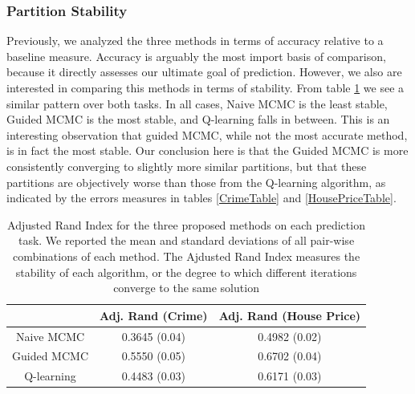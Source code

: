 \subsubsection{Partition Stability}
Previously, we analyzed the three methods in terms of accuracy relative to a baseline measure. Accuracy is arguably the most import basis of comparison, because it directly assesses our ultimate goal of prediction. However, we also are interested in comparing this methods in terms of stability. From table \ref{rand:table} we see a similar pattern over both tasks. In all cases, Naive MCMC is the least stable, Guided MCMC is the most stable, and Q-learning falls in between.  This is an interesting observation that guided MCMC, while not the most accurate method, is in fact the most stable. Our conclusion here is that the Guided MCMC is more consistently converging to slightly more similar partitions, but that these partitions are objectively worse than those from the Q-learning algorithm, as indicated by the errors measures in tables \ref{CrimeTable} and \ref{HousePriceTable}.
\begin{center}
\begin{table}[h!]
\begin{tabular}{ |c|c|c| } 
 \hline
    & Adj. Rand (Crime) & Adj. Rand (House Price) \\
 \hline

 Naive MCMC &  0.3645 (0.04) & 0.4982 (0.02) \\
 \hline
 Guided MCMC &  0.5550 (0.05) & 0.6702 (0.04)\\ 
 \hline
 Q-learning  &  0.4483 (0.03) & 0.6171 (0.03)\\  
 \hline
\end{tabular}
\caption{Adjusted Rand Index for the three proposed methods on each prediction task. We reported the mean and standard deviations of all pair-wise combinations of each method. The Ajdusted Rand Index measures the stability of each algorithm, or the degree to which different iterations converge to the same solution}
\label{rand:table}
\end{table}
\end{center}




